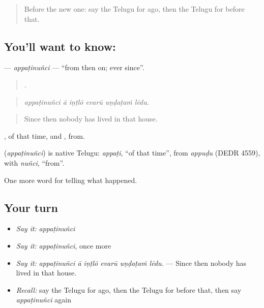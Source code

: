 \label{lesson:TE-C380-appatinunci}



\begin{quote}
Before the new one: say the Telugu for ago, then the Telugu for before that.
\end{quote}

\subsection*{You'll want to know: }
\textbf{} — \emph{appaṭinuñci} — \textquotedblleft{}from then on; ever since\textquotedblright{}.

\begin{quote}
     .
\end{quote}

\begin{quote}
\emph{appaṭinuñci ā iṇṭlō evarū uṇḍaṭaṁ lēdu.}
\end{quote}

\begin{quote}
Since then nobody has lived in that house.
\end{quote}

, of that time, and , from.

\begin{cousinweb}
\textbf{} (\emph{appaṭinuñci}) is native Telugu: \emph{appaṭi}, \textquotedblleft{}of that time\textquotedblright{}, from \emph{appuḍu} (DEDR 4559), with \emph{nuñci}, \textquotedblleft{}from\textquotedblright{}.
\end{cousinweb}

\begin{grammarlens}[title={What you've built}]
One more word for telling what happened.
\end{grammarlens}

\subsection*{Your turn}
\begin{itemize}
\raggedright
  \item \emph{Say it:} \emph{appaṭinuñci}
  \item \emph{Say it:} \emph{appaṭinuñci}, once more
  \item \emph{Say it:} \emph{appaṭinuñci ā iṇṭlō evarū uṇḍaṭaṁ lēdu.} — Since then nobody has lived in that house.
  \item \emph{Recall:} say the Telugu for ago, then the Telugu for before that, then say \emph{appaṭinuñci} again
\end{itemize}

